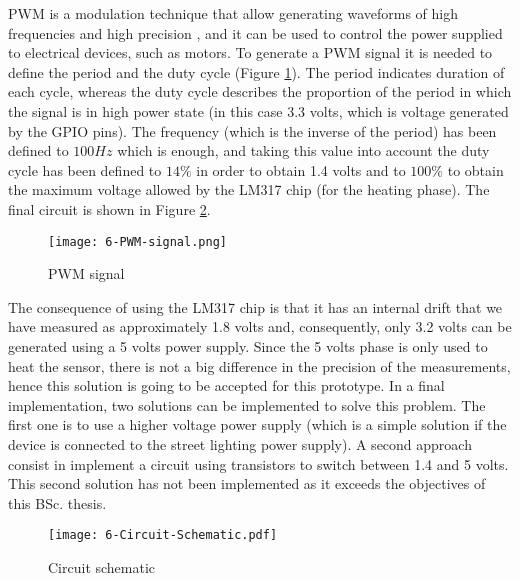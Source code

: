 \ac{PWM} is a modulation technique that allow generating waveforms of high frequencies and high precision \cite{DdlT16}, and it can be used to control the power supplied to electrical devices, such as motors. To generate a \ac{PWM} signal it is needed to define the period and the duty cycle (Figure \ref{fig:6-PWM-signal}). The period indicates duration of each cycle, whereas the duty cycle describes the proportion of the period in which the signal is in high power state (in this case 3.3 volts, which is voltage generated by the GPIO pins). The frequency (which is the inverse of the period) has been defined to $100 Hz$ which is enough, and taking this value into account the duty cycle has been defined to $14\%$ in order to obtain 1.4 volts and to $100\%$ to obtain the maximum voltage allowed by the LM317 chip (for the heating phase). The final circuit is shown in Figure \ref{fig:6-Circuit-Schematic}.

\begin{figure}[!h]
	\begin{center}
		\texttt{[image: 6-PWM-signal.png]}
		\caption{PWM signal}
		\label{fig:6-PWM-signal}
	\end{center}
\end{figure}

The consequence of using the LM317 chip is that it has an internal drift that we have measured as approximately 1.8 volts and, consequently, only 3.2 volts can be generated using a 5 volts power supply. Since the 5 volts phase is only used to heat the sensor, there is not a big difference in the precision of the measurements, hence this solution is going to be accepted for this prototype. In a final implementation, two solutions can be implemented to solve this problem. The first one is to use a higher voltage power supply (which is a simple solution if the device is connected to the street lighting power supply). A second approach consist in implement a circuit using transistors to switch between 1.4 and 5 volts. This second solution has not been implemented as it exceeds the objectives of this \ac{BSc.} thesis.


\begin{figure}[!h]
	\begin{center}
		\texttt{[image: 6-Circuit-Schematic.pdf]}
		\caption{Circuit schematic}
		\label{fig:6-Circuit-Schematic}
	\end{center}
\end{figure}

